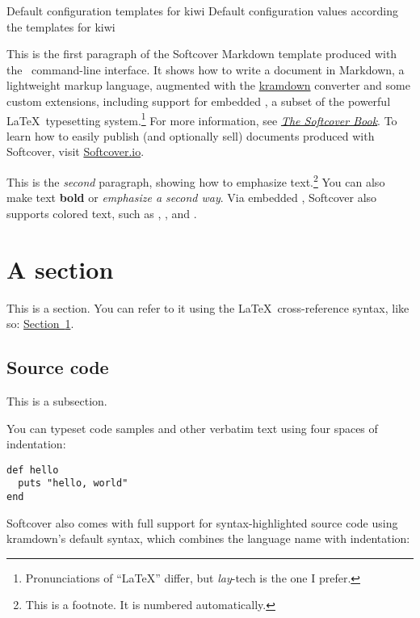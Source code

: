 Default configuration templates for kiwi
Default configuration values according the templates for kiwi

This is the first paragraph of the Softcover Markdown template produced with the \softcover\ command-line interface. It shows how to write a document in Markdown, a lightweight markup language, augmented with the \href{http://kramdown.gettalong.org/}{kramdown} converter and some custom extensions, including support for embedded \PolyTeX, a subset of the powerful \LaTeX\ typesetting system.\footnote{Pronunciations of ``LaTeX'' differ, but \emph{lay}-tech is the one I prefer.} For more information, see \href{http://manual.softcover.io/book}{\emph{The Softcover Book}}. To learn how to easily publish (and optionally sell) documents produced with Softcover, visit \href{http://softcover.io/}{Softcover.io}.

This is the \emph{second} paragraph, showing how to emphasize text.\footnote{This is a footnote. It is numbered automatically.} You can also make text \textbf{bold} or \emph{emphasize a second way}. Via embedded \PolyTeX, Softcover also supports colored text, such as , , and .

\section{A section}

\label{sec:a_section}

This is a section. You can refer to it using the \LaTeX\ cross-reference syntax, like so: \hyperref[sec:a_section]{Section~\ref{sec:a_section}}.

\subsection{Source code}

This is a subsection.

You can typeset code samples and other verbatim text using four spaces of indentation:

\begin{verbatim}
def hello
  puts "hello, world"
end
\end{verbatim}

Softcover also comes with full support for syntax-highlighted source code using kramdown's default syntax, which combines the language name with indentation:

